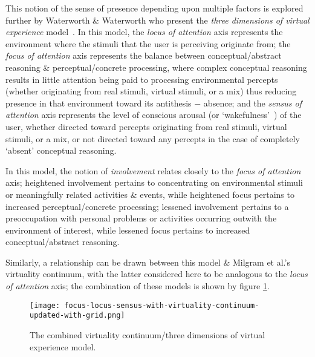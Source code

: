 This notion of the sense of presence depending upon multiple factors is explored further by Waterworth \& Waterworth who present the \textit{three dimensions of virtual experience} model~\cite{Waterworth2001}. In this model, the \textit{locus of attention} axis represents the environment where the stimuli that the user is perceiving originate from; the \textit{focus of attention} axis represents the balance between conceptual/abstract reasoning \& perceptual/concrete processing, where complex conceptual reasoning results in little attention being paid to processing environmental percepts (whether originating from real stimuli, virtual stimuli, or a mix) thus reducing presence\presencefootnote{} in that environment toward its antithesis $-$ absence\absencefootnote{}; and the \textit{sensus of attention} axis represents the level of conscious arousal (or `wakefulness'~\cite{Laureys2009}) of the user, whether directed toward percepts originating from real stimuli, virtual stimuli, or a mix, or not directed toward any percepts in the case of completely `absent' conceptual reasoning.

In this model, the notion of \textit{involvement} relates closely to the \textit{focus of attention} axis; heightened involvement pertains to concentrating on environmental stimuli or meaningfully related activities \& events, while heightened focus pertains to increased perceptual/concrete processing; lessened involvement pertains to a preoccupation with personal problems or activities occurring outwith the environment of interest, while lessened focus pertains to increased conceptual/abstract reasoning.

Similarly, a relationship can be drawn between this model \& Milgram et al.'s virtuality continuum, with the latter considered here to be analogous to the \textit{locus of attention} axis; the combination of these models is shown by figure \ref{focus-locus-sensus-with-virtuality-continuum}.

\begin{figure}[h]
	\begin{center}
		\texttt{[image: focus-locus-sensus-with-virtuality-continuum-updated-with-grid.png]}
		\caption{The combined virtuality continuum/three dimensions of virtual experience model.}
		\label{focus-locus-sensus-with-virtuality-continuum}
	\end{center}	
\end{figure}


